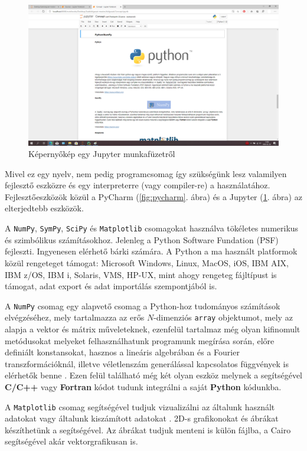 \begin{figure}
\centering
\includegraphics[width=\textwidth]{img/Jupyter_screenshot.png}
\caption{Képernyőkép egy Jupyter munkafüzetről}
\label{fig:jupyter}
\end{figure}

Mivel ez egy nyelv, nem pedig programcsomag így
szükségünk lesz valamilyen fejlesztő eszközre és egy interpreterre (vagy
compiler-re) a használatához.
Fejlesztőeszközök közül a PyCharm \cite{pycharm} (\ref{fig:pycharm}. ábra) és a Jupyter \cite{jupyter} (\ref{fig:jupyter}. ábra) az elterjedtebb eszközök.

A \texttt{NumPy}, \texttt{SymPy},
\texttt{SciPy} és \texttt{Matplotlib} csomagokat használva tökéletes
numerikus és szimbólikus számításokhoz. Jelenleg a Python Software
Fundation (PSF) fejleszti. Ingyenesen elérhető bárki számára. A Python a
ma használt platformok közül rengeteget támogat: Microsoft Windows,
Linux, MacOS, iOS, IBM AIX, IBM z/OS, IBM i, Solaris, VMS, HP-UX, mint
ahogy rengeteg fájltípust is támogat, adat export és adat importálás
szempontjából is.

A \texttt{NumPy} csomag egy alapvető csomag a Python-hoz tudományos
számítások elvégzéséhez, mely tartalmazza az erős $N$-dimenziós
\texttt{array} objektumot, mely az alapja a vektor és mátrix
műveleteknek, ezenfelül tartalmaz még olyan kifinomult metódusokat
melyeket felhasználhatunk programunk megírása során, előre definiált
konstansokat, hasznos a lineáris algebrában és a Fourier
transzformációknál, illetve véletlenszám generálással kapcsolatos
függvények is elérhetők benne \cite{numpy}. Ezen felül található még két olyan eszköz
melynek a segítségével \textbf{C/C++} vagy \textbf{Fortran} kódot tudunk
integrálni a saját \textbf{Python} kódunkba.

A \texttt{Matplotlib} csomag segítségével tudjuk vizualizálni az
általunk használt adatokat vagy általunk kiszámított adatokat \cite{matplotlib}. 2D-s
grafikonokat és ábrákat készíthetünk a segítségével. Az ábrákat tudjuk
menteni is külön fájlba, a Cairo segítségével akár vektorgrafikusan is.

